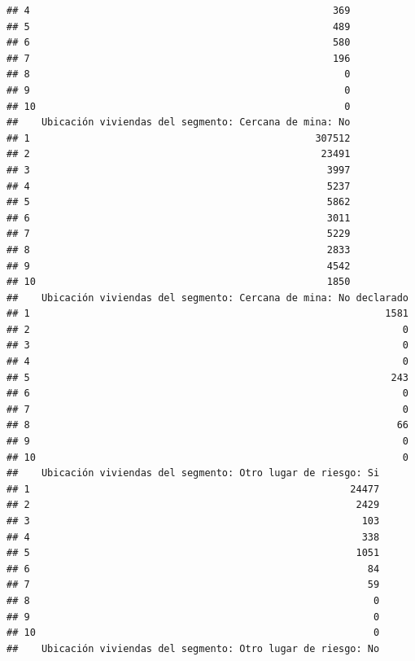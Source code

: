 \documentclass[11pt,]{article}
\begin{document}
\begin{verbatim}
## 4                                                    369
## 5                                                    489
## 6                                                    580
## 7                                                    196
## 8                                                      0
## 9                                                      0
## 10                                                     0
##    Ubicación viviendas del segmento: Cercana de mina: No
## 1                                                 307512
## 2                                                  23491
## 3                                                   3997
## 4                                                   5237
## 5                                                   5862
## 6                                                   3011
## 7                                                   5229
## 8                                                   2833
## 9                                                   4542
## 10                                                  1850
##    Ubicación viviendas del segmento: Cercana de mina: No declarado
## 1                                                             1581
## 2                                                                0
## 3                                                                0
## 4                                                                0
## 5                                                              243
## 6                                                                0
## 7                                                                0
## 8                                                               66
## 9                                                                0
## 10                                                               0
##    Ubicación viviendas del segmento: Otro lugar de riesgo: Si
## 1                                                       24477
## 2                                                        2429
## 3                                                         103
## 4                                                         338
## 5                                                        1051
## 6                                                          84
## 7                                                          59
## 8                                                           0
## 9                                                           0
## 10                                                          0
##    Ubicación viviendas del segmento: Otro lugar de riesgo: No

\end{verbatim}
\end{document}
